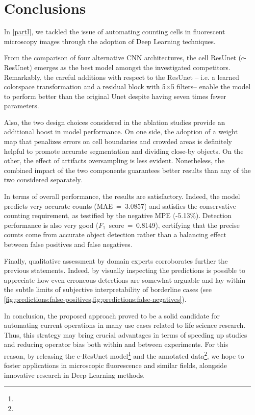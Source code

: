 \chapter{Conclusions}
\label{chap:partI_conclusions}
In \cref{partI}, we tackled the issue of automating counting cells in fluorescent microscopy images through the adoption of Deep Learning techniques.

From the comparison of four alternative CNN architectures, the cell ResUnet (c-ResUnet) emerges as the best model amongst the investigated competitors.
Remarkably, the careful additions with respect to the ResUnet \cite{deep_resunet} -- i.e. a learned colorspace transformation and a residual block with 5$\times$5 filters-- enable the model to perform better than the original Unet \cite{unet} despite having seven times fewer parameters.

Also, the two design choices considered in the ablation studies provide an additional boost in model performance. 
On one side, the adoption of a weight map that penalizes errors on cell boundaries and crowded areas is definitely helpful to promote accurate segmentation and dividing close-by objects. 
On the other, the effect of artifacts oversampling is less evident.
Nonetheless, the combined impact of the two components guarantees better results than any of the two considered separately.

In terms of overall performance, the results are satisfactory. 
Indeed, the model predicts very accurate counts (\mbox{MAE = 3.0857}) and satisfies the conservative counting requirement, as testified by the negative MPE (-5.13\%).
Detection performance is also very good (\mbox{$F_1$ score = 0.8149}), certifying that the precise counts come from accurate object detection rather than a balancing effect between false positives and false negatives.

Finally, qualitative assessment by domain experts corroborates further the previous statements. 
Indeed, by visually inspecting the predictions is possible to appreciate how even erroneous detections are somewhat arguable and lay within the subtle limits of subjective interpretability of borderline cases (see \cref{fig:predictions:false-positives,fig:predictions:false-negatives}).


In conclusion, the proposed approach proved to be a solid candidate for automating current operations in many use cases related to life science research.
Thus, this strategy may bring crucial advantages in terms of speeding up studies and reducing operator bias both within and between experiments.
For this reason, by releasing the c-ResUnet model\footnote{\linkmodel} and the annotated data\footnote{\dataset}, we hope to foster applications in microscopic fluorescence and similar fields, alongside innovative research in Deep Learning methods.